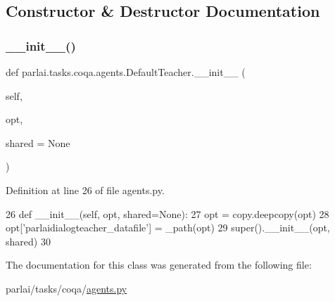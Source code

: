\subsection{Constructor \& Destructor Documentation}
\mbox{\label{classparlai_1_1tasks_1_1coqa_1_1agents_1_1DefaultTeacher_a62b634fe9152617c94604f39ff7851a1}} 
\subsubsection{\texorpdfstring{\+\_\+\+\_\+init\+\_\+\+\_\+()}{\_\_init\_\_()}}
{\footnotesize\ttfamily def parlai.\+tasks.\+coqa.\+agents.\+Default\+Teacher.\+\_\+\+\_\+init\+\_\+\+\_\+ (\begin{DoxyParamCaption}\item[{}]{self,  }\item[{}]{opt,  }\item[{}]{shared = {\ttfamily None} }\end{DoxyParamCaption})}



Definition at line 26 of file agents.\+py.


\begin{DoxyCode}
26     \textcolor{keyword}{def }\_\_init\_\_(self, opt, shared=None):
27         opt = copy.deepcopy(opt)
28         opt[\textcolor{stringliteral}{'parlaidialogteacher\_datafile'}] = \_path(opt)
29         super().\_\_init\_\_(opt, shared)
30 \end{DoxyCode}


The documentation for this class was generated from the following file\+:\begin{DoxyCompactItemize}
\item 
parlai/tasks/coqa/\hyperlink{parlai_2tasks_2coqa_2agents_8py}{agents.\+py}\end{DoxyCompactItemize}
